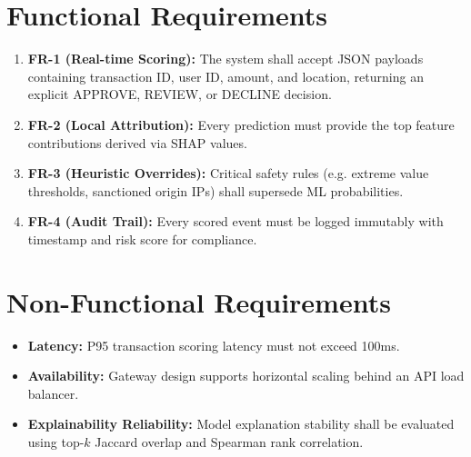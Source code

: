 \documentclass[11pt,a4paper]{article}
\begin{document}
\section{Functional Requirements}
\begin{enumerate}
    \item \textbf{FR-1 (Real-time Scoring):} The system shall accept JSON payloads containing transaction ID, user ID, amount, and location, returning an explicit APPROVE, REVIEW, or DECLINE decision.
    \item \textbf{FR-2 (Local Attribution):} Every prediction must provide the top feature contributions derived via SHAP values.
    \item \textbf{FR-3 (Heuristic Overrides):} Critical safety rules (e.g. extreme value thresholds, sanctioned origin IPs) shall supersede ML probabilities.
    \item \textbf{FR-4 (Audit Trail):} Every scored event must be logged immutably with timestamp and risk score for compliance.
\end{enumerate}

\section{Non-Functional Requirements}
\begin{itemize}
    \item \textbf{Latency:} P95 transaction scoring latency must not exceed 100ms.
    \item \textbf{Availability:} Gateway design supports horizontal scaling behind an API load balancer.
    \item \textbf{Explainability Reliability:} Model explanation stability shall be evaluated using top-$k$ Jaccard overlap and Spearman rank correlation.
\end{itemize}
\end{document}
